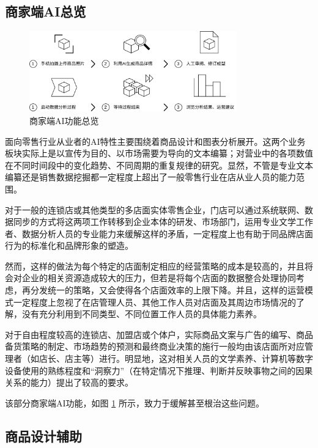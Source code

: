 \subsection{商家端AI总览}
\label{sec:owner_features}

\begin{figure}[htbp]
	\centering
	\includegraphics[width=0.8\textwidth]{./imgs/ai-owner-workflow.png}
	\caption{商家端AI功能总览}
	\label{fig:ai-owner-workflow}
\end{figure}

面向零售行业从业者的AI特性主要围绕着商品设计和图表分析展开。这两个业务板块实际上是以宣传为目的、以市场需要为导向的文本编纂；对营业中的各项数值在不同时间段中的变化趋势、不同周期的重复规律的研究。显然，不管是专业文本编纂还是销售数据挖掘都一定程度上超出了一般零售行业在店从业人员的能力范围。

对于一般的连锁店或其他类型的多店面实体零售企业，门店可以通过系统联网、数据同步的方式将这两项工作转移到企业本体的研发、市场部门，运用专业文学工作者、数据分析人员的专业能力来缓解这样的矛盾，一定程度上也有助于同品牌店面行为的标准化和品牌形象的塑造。

然而，这样的做法为每个特定的店面制定相应的经营策略的成本是较高的，并且将会对企业的相关资源造成较大的压力，但若是将每个店面的数据整合处理协同考虑，再分发统一的策略，又会使得各个店面效率的上限下降。并且，这样的运营模式一定程度上忽视了在店管理人员、其他工作人员对店面及其周边市场情况的了解，没有充分利用到不同类型、不同位置工作人员的具体能力素养。

对于自由程度较高的连锁店、加盟店或个体户，实际商品文案与广告的编写、商品备货策略的制定、市场趋势的预测和最终商业决策的施行一般均由该店面所对应管理者（如店长、店主等）进行。明显地，这对相关人员的文学素养、计算机等数字设备使用的熟练程度和“洞察力”（在特定情况下推理、判断并反映事物之间的因果关系的能力）提出了较高的要求。

该部分商家端AI功能，如图 \ref{fig:ai-owner-workflow} 所示，致力于缓解甚至根治这些问题。

\subsection{商品设计辅助}

